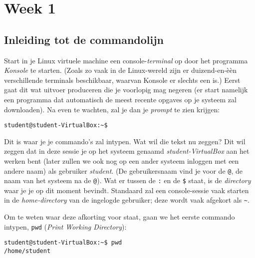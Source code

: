 \documentclass[a4paper,twoside,openany]{memoir}
\begin{document}
\part{Week 1}
\chapter{Inleiding tot de commandolijn}

Start in je Linux virtuele machine een console-\emph{terminal} op door het programma \emph{Konsole} te starten. (Zoals zo vaak in de Linux-wereld zijn er duizend-en-\`e\`en verschillende terminals beschikbaar, waarvan Konsole er slechts een is.) Eerst gaat dit wat uitvoer produceren die je voorlopig mag negeren (er start namelijk een programma dat automatisch de meest recente opgaves op je systeem zal downloaden). Na even te wachten, zal je dan je \emph{prompt} te zien krijgen:

\begin{verbatim}
student@student-VirtualBox:~$ 
\end{verbatim}

Dit is waar je je commando's zal intypen. Wat wil die tekst nu zeggen? Dit wil zeggen dat in deze sessie je op het systeem genaamd \emph{student-VirtualBox} aan het werken bent (later zullen we ook nog op een ander systeem inloggen met een andere naam) als gebruiker \emph{student}. (De gebruikersnaam vind je voor de \texttt{@}, de naam van het systeem na de \texttt{@}). Wat er tussen de \texttt{:} en de \texttt{\$} staat, is de \emph{directory} waar je je op dit moment bevindt. Standaard zal een console-sessie vaak starten in de \emph{home-directory} van de ingelogde gebruiker; deze wordt vaak afgekort als \texttt{\~}.

Om te weten waar deze afkorting voor staat, gaan we het eerste commando intypen, \verb!pwd! (\emph{Print Working Directory}):
\begin{verbatim}
student@student-VirtualBox:~$ pwd
/home/student
\end{verbatim}
\end{document}
